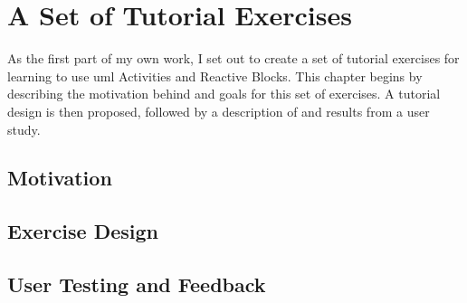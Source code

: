 \chapter{A Set of Tutorial Exercises}
\label{ch:tutorial_exercises}
As the first part of my own work, I set out to create a set of tutorial exercises for learning to use \gls{uml} Activities and Reactive Blocks. This chapter begins by describing the motivation behind and goals for this set of exercises. A tutorial design is then proposed, followed by a description of and results from a user study.

\section{Motivation}
\label{sec:exercises_motivation}


\section{Exercise Design}
\label{sec:exercise_design}



\section{User Testing and Feedback}
\label{sec:exercises_testing}